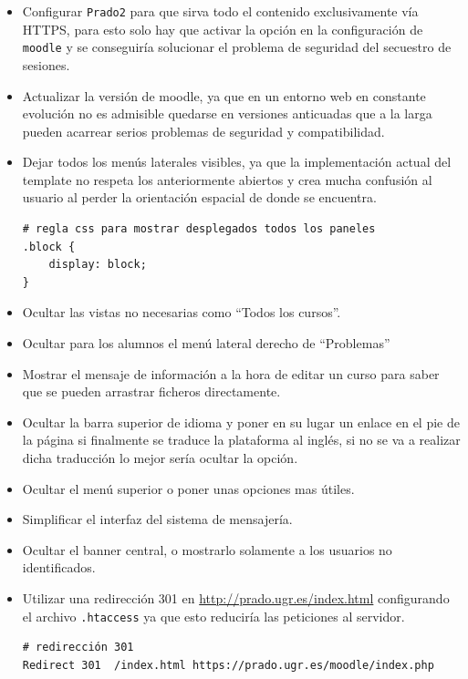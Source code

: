 \begin{itemize}
	\item Configurar \texttt{Prado2} para que sirva todo el contenido exclusivamente vía HTTPS, para esto solo hay que activar la opción en la configuración de \texttt{moodle} y se conseguiría solucionar el problema de seguridad del secuestro de sesiones.

	\item Actualizar la versión de moodle, ya que en un entorno web en constante evolución no es admisible quedarse en versiones anticuadas que a la larga pueden acarrear serios problemas de seguridad y compatibilidad.

	\item Dejar todos los menús laterales visibles, ya que la implementación actual del template no respeta los anteriormente abiertos y crea mucha confusión al usuario al perder la orientación espacial de donde se encuentra.
\begin{lstlisting}[language=html]
# regla css para mostrar desplegados todos los paneles
.block {
	display: block;
}
\end{lstlisting}

	\item Ocultar las vistas no necesarias como ``Todos los cursos''.
	\item Ocultar para los alumnos el menú lateral derecho de ``Problemas''
	\item Mostrar el mensaje de información a la hora de editar un curso para saber que se pueden arrastrar ficheros directamente.
	\item Ocultar la barra superior de idioma y poner en su lugar un enlace en el pie de la página si finalmente se traduce la plataforma al inglés, si no se va a realizar dicha traducción lo mejor sería ocultar la opción.
	\item Ocultar el menú superior o poner unas opciones mas útiles.
	\item Simplificar el interfaz del sistema de mensajería.
	\item Ocultar el banner central, o mostrarlo solamente a los usuarios no identificados.
	\item Utilizar una redirección 301 en \url{http://prado.ugr.es/index.html} configurando el archivo \texttt{.htaccess} ya que esto reduciría las peticiones al servidor.
\begin{lstlisting}
# redirección 301
Redirect 301  /index.html https://prado.ugr.es/moodle/index.php
\end{lstlisting}


\end{itemize}
